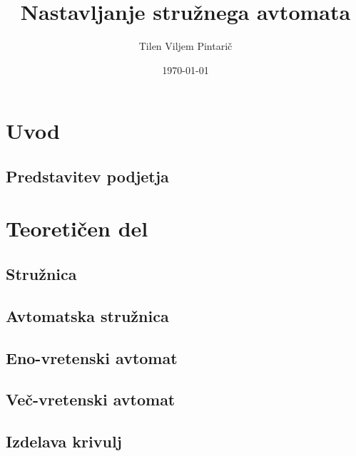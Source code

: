\documentclass[a4paper, 12pt]{article}
\title{Nastavljanje stružnega avtomata}
\author{Tilen Viljem Pintarič}
\date{\today}
\begin{document}


\newpage\null\thispagestyle{empty}\newpage



\pagestyle{fancy}
\fancyhf{}
\renewcommand{\headrulewidth}{0pt}
\fancyfoot[R]{\fontsize{12}{18} \thepage}


\newpage

\tableofcontents
\newpage

\listoffigures
\newpage

\listoftables
\newpage

\section{Uvod}
\subsection{Predstavitev podjetja}


\section{Teoretičen del}
\subsection{Stružnica}

\newpage

\subsection{Avtomatska stružnica}

\newpage

\subsection{Eno-vretenski avtomat}


\subsection{Več-vretenski avtomat}


\subsection{Izdelava krivulj}

\end{document}
